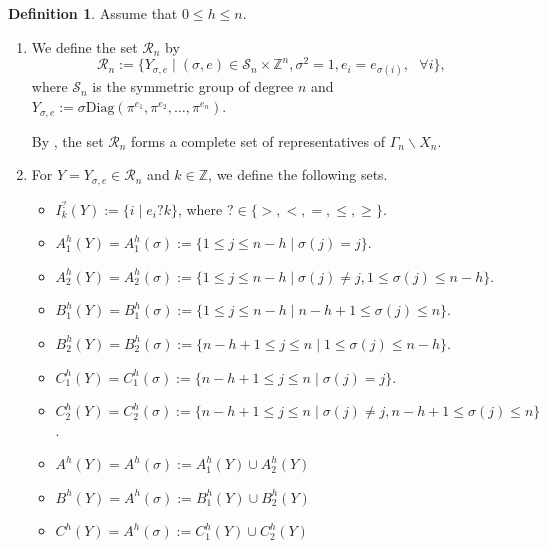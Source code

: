 \documentclass[11pt,oneside]{amsart}
\theoremstyle{plain}
\theoremstyle{definition}
\newtheorem{definition}[theorem]{Definition}
\theoremstyle{remark}
\newcommand{\BZ}{{\mathbb Z}}
\newcommand{\CR}{{\mathcal R}}
\newcommand{\CS}{{\mathcal S}}
\newcommand{\diag}{\mathrm{Diag}}
\numberwithin{equation}{section}
\begin{document}
	\begin{definition}\label{definition2.5}
		Assume that $0 \leq h \leq n$.
		\begin{enumerate}
			\item We define the set $\CR_n$ by
			\begin{equation*}
				\CR_n:=\lbrace Y_{\sigma,e} \mid (\sigma, e)\in \CS_n \times \BZ^n, \sigma^2=1, e_i=e_{\sigma(i)}, \text{ }\forall i\rbrace,
			\end{equation*}
			where $\CS_n$ is the symmetric group of degree $n$ and $Y_{\sigma,e}:=\sigma \diag(\pi^{e_1},\pi^{e_2},\dots,\pi^{e_n})$.
			
			By \cite[Theorem 1]{Hi}, the set $\CR_n$ forms a complete set of representatives of $\Gamma_n \backslash X_n$.
			
			\item For $Y=Y_{\sigma,e} \in \CR_n$ and $k \in \BZ$, we define the following sets.
			\begin{itemize}
				\item $I^{?}_k(Y):=\lbrace i  \mid e_i?k \rbrace$, where $? \in \lbrace >,<,=,\leq, \geq \rbrace$.
				\item $A_1^{h}(Y)=A_1^{h}(\sigma):=\lbrace 1 \leq j \leq n-h \mid \sigma(j)=j \rbrace$.
				\item $A_2^{h}(Y)=A_2^{h}(\sigma):=\lbrace 1 \leq j \leq n-h \mid \sigma(j) \neq j, 1 \leq \sigma(j) \leq n-h \rbrace$.
				\item $B_1^{h}(Y)=B_1^{h}(\sigma):=\lbrace 1 \leq j \leq n-h \mid n-h+1 \leq \sigma(j) \leq n \rbrace$.
				\item $B_2^{h}(Y)=B_2^{h}(\sigma):=\lbrace n-h+1 \leq j \leq n \mid 1 \leq \sigma(j) \leq n-h \rbrace$.
				\item $C_1^{h}(Y)=C_1^{h}(\sigma):=\lbrace n-h+1 \leq j \leq n \mid \sigma(j)=j \rbrace$.
				\item $C_2^{h}(Y)=C_2^{h}(\sigma):=\lbrace n-h+1 \leq j \leq n \mid \sigma(j) \neq j, n-h+1 \leq \sigma(j) \leq n \rbrace$.
				\item $A^{h}(Y)=A^h(\sigma):=A_1^{h}(Y) \cup A_2^{h}(Y)$
				\item $B^{h}(Y)=A^h(\sigma):=B_1^{h}(Y) \cup B_2^{h}(Y)$
				\item $C^{h}(Y)=A^h(\sigma):=C_1^{h}(Y) \cup C_2^{h}(Y)$
			\end{itemize}
			

\end{enumerate}
\end{definition}
\end{document}
